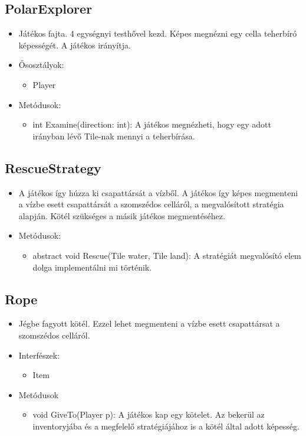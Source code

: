 \subsection{PolarExplorer}
\begin{itemize}
	\item Játékos fajta. 4 egységnyi testhővel kezd. Képes megnézni egy cella teherbíró képességét. A játékos irányítja.
	\item Ősosztályok:
	\begin{itemize}
		\item Player
	\end{itemize}
	\item Metódusok:
	\begin{itemize}
		\item int Examine(direction: int): A játékos megnézheti, hogy egy adott irányban lévő Tile-nak mennyi a teherbírása.
	\end{itemize}
\end{itemize}

\subsection{RescueStrategy}
\begin{itemize}
	\item A játékos így húzza ki csapattársát a vízből. A játékos így képes megmenteni a vízbe esett csapattársát a szomszédos celláról, a megvalósított stratégia alapján. Kötél szükséges a másik játékos megmentéséhez.
	\item Metódusok:
	\begin{itemize}
		\item abstract void Rescue(Tile water, Tile land): A stratégiát megvalósító elem dolga implementálni mi történik.
	\end{itemize}
\end{itemize}

\subsection{Rope}
\begin{itemize}
	\item Jégbe fagyott kötél. Ezzel lehet megmenteni a vízbe esett csapattársat a szomszédos celláról.
	\item Interfészek:
	\begin{itemize}
		\item Item
	\end{itemize}
	\item Metódusok
	\begin{itemize}
		\item void GiveTo(Player p): A játékos kap egy kötelet. Az bekerül az inventoryjába és a megfelelő stratégiájához is a kötél által adott képesség.
	\end{itemize}
\end{itemize}

